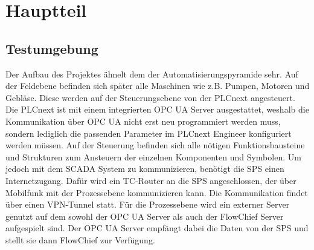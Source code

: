 \section{Hauptteil}

\subsection{Testumgebung}

Der Aufbau des Projektes ähnelt dem der Automatisierungspyramide sehr. Auf der Feldebene befinden sich später alle Maschinen wie z.B. Pumpen, Motoren und Gebläse. Diese werden auf der Steuerungsebene von der PLCnext angesteuert. Die PLCnext ist mit einem integrierten OPC UA Server ausgestattet, weshalb die Kommunikation über OPC UA nicht erst neu programmiert werden muss, sondern lediglich die passenden Parameter im PLCnext Engineer konfiguriert werden müssen. Auf der Steuerung befinden sich alle nötigen Funktionsbausteine und Strukturen zum Ansteuern der einzelnen Komponenten und Symbolen. Um jedoch mit dem SCADA System zu kommunizieren, benötigt die SPS einen Internetzugang. Dafür wird ein TC-Router an die SPS angeschlossen, der über Mobilfunk mit der Prozessebene kommunizieren kann. Die Kommunikation findet über einen VPN-Tunnel statt. Für die Prozessebene wird ein externer Server genutzt auf dem sowohl der OPC UA Server als auch der FlowChief Server aufgespielt sind. Der OPC UA Server empfängt dabei die Daten von der SPS und stellt sie dann FlowChief zur Verfügung. 